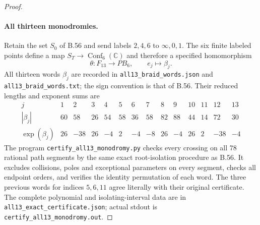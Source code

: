\begin{proof}
\paragraph{All thirteen monodromies.}
Retain the set $S_0$ of B.56 and send labels $2,4,6$ to
$\infty,0,1$.  The six finite labeled points define a map
$S_T\to\operatorname{Conf}_6(\mathbb C)$ and therefore a
specified homomorphism
\[
 \theta:F_{13}\longrightarrow PB_6,\qquad e_j\longmapsto\beta_j.
 \tag{B.56.6}
\]
All thirteen words $\beta_j$ are recorded in
\texttt{all13\_braid\_words.json} and
\texttt{all13\_braid\_words.txt}; the sign convention is that
of B.56.  Their reduced lengths and exponent sums are
\[
\begin{array}{c|rrrrrrrrrrrrr}
j&1&2&3&4&5&6&7&8&9&10&11&12&13\\\hline
|\beta_j|&60&58&26&54&58&36&58&82&88&44&14&72&30\\
\operatorname{exp}(\beta_j)&26&-38&26&-4&2&-4&-8&26&-4&26&2&-38&-4
\end{array}
\]
The program \texttt{certify\_all13\_monodromy.py} checks every
crossing on all $78$ rational path segments by the same exact
root-isolation procedure as B.56.  It excludes collisions,
poles and exceptional parameters on every segment, checks all
endpoint orders, and verifies the identity permutation of
each word.  The three previous words for indices $5,6,11$
agree literally with their original certificate.
The complete polynomial and isolating-interval data are in
\texttt{all13\_exact\_certificate.json}; actual stdout is
\texttt{certify\_all13\_monodromy.out}.


\end{proof}

